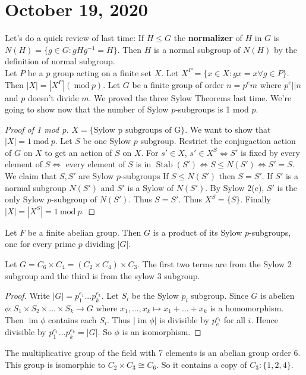 \documentclass{article}
\newcommand{\vocab}[1]{\textbf{\color{blue!90}\boldmath #1}}
\renewcommand{\mod}[1]{\ \text{mod}\ #1}
\newcommand{\ra}[1][]{\xrightarrow{#1}}
\DeclareMathOperator{\im}{im}
\DeclareMathOperator{\Stab}{Stab}
\begin{document}
\section{October 19, 2020}
Let's do a quick review of last time:
If $H\leq G$ the \vocab{normalizer} of $H$ in $G$ is $N(H)=\{g\in G:gHg^{-1}=H\}$. Then $H$ is a normal subgroup of $N(H)$ by the definition of normal subgroup.\\
Let $P$ be a $p$ group acting on a finite set $X$. Let $X^P=\{x\in X:gx=x\forall g\in P\}$. Then $|X|=|X^P|(\mod{p})$. Let $G$ be a finite group of order $n=p^em$ where $p^e||n$ and $p$ doesn't divide $m$. We proved the three Sylow Theorems last time.
We're going to show now that the number of Sylow $p$-subgroups is 1 mod $p$.
\begin{proof}[Proof of 1 mod p]
$X=\{\textrm{Sylow p subgroups of G}\}$. We want to show that $|X|=1\mod{p}$. Let $S$ be one Sylow $p$ subgroup. Restrict the conjugaction action of $G$ on $X$ to get an action of $S$ on $X$. For $s'\in X$, $s'\in X^S\iff S'$ is fixed by every element of $S\iff$ every element of $S$ is in $\Stab(S')\iff S\leq N(S')\iff S'=S$. We claim that $S,S'$ are Sylow $p$-subgroups If $S\leq N(S')$ then $S=S'$. If $S'$ is a normal subgroup $N(S')$ and $S'$ is a Sylow of $N(S')$. By Sylow 2(c), $S'$ is the only Sylow $p$-subgroup of $N(S')$. Thus $S=S'$. Thus $X^S=\{S\}$. Finally $|X|=|X^S|=1\mod{p}$.
\end{proof}
\begin{theorem}
Let $F$ be a finite abelian group. Then $G$ is a product of its Sylow $p$-subgroups, one for every prime $p$ dividing $|G|$.
\end{theorem}
\begin{example}
Let $G=C_6\times C_4=(C_2\times C_4)\times C_3$. The first two terms are from the Sylow 2 subgroup and the third is from the sylow 3 subgroup. 
\end{example}
\begin{proof}
Write $|G|=p_1^{e_1}...p_k^{e_k}$. Let $S_i$ be the Sylow $p_i$ subgroup. Since $G$ is abelien $\phi:S_1\times S_2\times...\times S_k\ra G$ where $x_1,...,x_k\mapsto x_1+...+x_k$ is a homomorphism. Then $\im\phi$ contains each $S_i$. Thus $|\im\phi|$ is divisible by $p_e^{e_i}$ for all $i$. Hence divisible by $p_1^{e_1}...p_k^{e_k}=|G|$. So $\phi$ is an isomorphism.
\end{proof}
\begin{example}
The multiplicative group of the field with 7 elements is an abelian group order 6. This group is isomorphic to $C_2\times C_3\cong C_6$. So it contains a copy of $C_3: \{1,2,4\}$.
\end{example}
\end{document}
